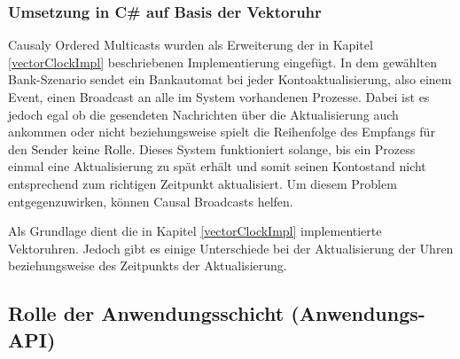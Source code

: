 \subsubsection{Umsetzung in C\# auf Basis der Vektoruhr}
Causaly Ordered Multicasts wurden als Erweiterung der in Kapitel \ref{vectorClockImpl} beschriebenen Implementierung eingefügt. In dem gewählten Bank-Szenario sendet ein Bankautomat bei jeder Kontoaktualisierung, also einem Event, einen Broadcast an alle im System vorhandenen Prozesse. Dabei ist es jedoch egal ob die gesendeten Nachrichten über die Aktualisierung auch ankommen oder nicht beziehungsweise spielt die Reihenfolge des Empfangs für den Sender keine Rolle. Dieses System funktioniert solange, bis ein Prozess einmal eine Aktualisierung zu spät erhält und somit seinen Kontostand nicht entsprechend zum richtigen Zeitpunkt aktualisiert. Um diesem Problem entgegenzuwirken, können Causal Broadcasts helfen.

Als Grundlage dient die in Kapitel \ref{vectorClockImpl} implementierte Vektoruhren. Jedoch gibt es einige Unterschiede bei der Aktualisierung der Uhren beziehungsweise des Zeitpunkts der Aktualisierung.


 
\subsection{Rolle der Anwendungsschicht (Anwendungs-API)}
